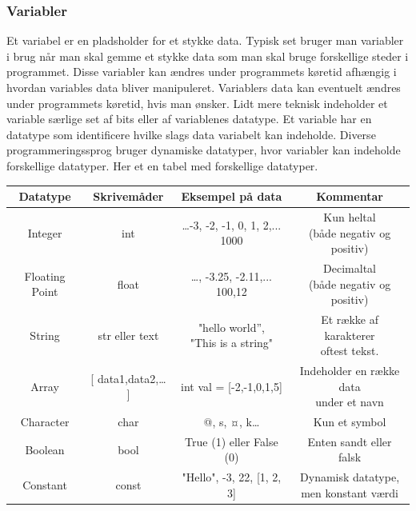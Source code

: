 \documentclass[12pt]{article}
\begin{document}
\newpage
\subsubsection{Variabler}
Et variabel er en pladsholder for et stykke data. Typisk set bruger man variabler i brug når man skal gemme et stykke data som man skal bruge forskellige steder i programmet. Disse variabler kan ændres under programmets køretid afhængig i hvordan variables data bliver manipuleret. Variablers data kan eventuelt ændres under programmets køretid, hvis man ønsker. Lidt mere teknisk indeholder et variable særlige set af bits eller af variablenes datatype. Et variable har en datatype som identificere hvilke slags data variabelt kan indeholde. Diverse programmeringssprog bruger dynamiske datatyper, hvor variabler kan indeholde forskellige datatyper. Her et en tabel med forskellige datatyper.
\begin{table}[ht]
  \centering
  \begin{tabular}{ |c|c|c|c| }
   \hline
   \textbf{Datatype} & \textbf{Skrivemåder} & \textbf{Eksempel på data} & \textbf{Kommentar} \\ 
   \hline
   Integer & int & \small{…-3, -2, -1, 0, 1, 2,... 1000} & \shortstack{Kun heltal\\ \footnotesize{(både negativ og positiv)}} \\
   \hline
   Floating Point & float & …, -3.25, -2.11,... 100,12  & \shortstack{Decimaltal\\ \footnotesize{(både negativ og positiv)}} \\ 
   \hline
   String & str eller text & \shortstack{"hello world”, \\ "This is a string"}  &  \shortstack{Et række af karakterer\\ oftest tekst.} \\ 
   \hline
   Array & [ data1,data2,… ] & int val = [-2,-1,0,1,5] & \shortstack{Indeholder en række data \\ under et navn} \\ 
   \hline
   Character & char & @, s, ¤, k…  & Kun et symbol \\ 
   \hline
   Boolean & bool & True (1) eller False (0)  & Enten sandt eller falsk \\ 
   \hline
   Constant & const & "Hello", -3, 22, [1, 2, 3] & \shortstack{Dynamisk datatype, \\ men konstant værdi} \\ 
   \hline
  \end{tabular}
\end{table}
\end{document}
